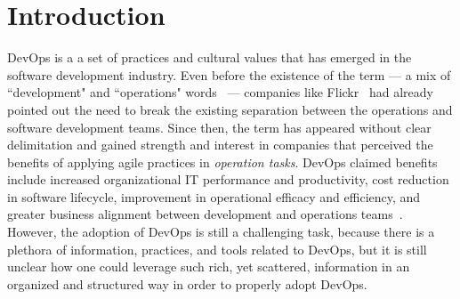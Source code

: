 \section{Introduction} \label{sec:introduction}

DevOps is a a set of practices and cultural values that has emerged in the
software development industry. Even before
the existence of the term --- a mix of ``development" and ``operations"
words~\cite{httermann2012devops} --- companies like Flickr~\cite{flickr}
had already pointed out the need to break the existing separation between
the operations and software development teams. Since then, the term
has appeared without clear delimitation and gained strength and interest
in companies that perceived the benefits of applying agile practices in
\emph{operation tasks}.
DevOps claimed benefits include increased organizational IT
performance and productivity, cost reduction in software lifecycle, improvement
in operational efficacy and efficiency, and greater business alignment between
development and operations teams~\cite{characterizing_devops_sbes_2016}.
However, the adoption of DevOps is still a challenging task, because there is a
plethora of information, practices, and tools related to DevOps, but it is still unclear
how one could leverage such rich, yet scattered, information in an organized and
structured way in order to properly adopt DevOps.



